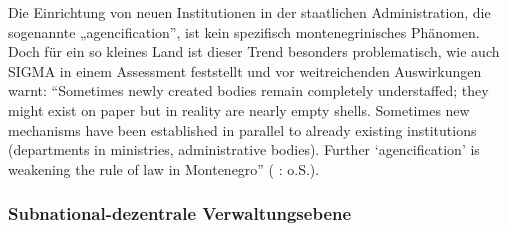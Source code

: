 Die Einrichtung von neuen Institutionen in der staatlichen Administration, die sogenannte „agencification”, ist kein spezifisch montenegrinisches Phänomen. Doch für ein so kleines Land ist dieser Trend besonders problematisch, wie auch SIGMA in einem Assessment feststellt und vor weitreichenden Auswirkungen warnt: “Sometimes newly created bodies remain completely understaffed; they might exist on paper but in reality are nearly empty shells. Sometimes new mechanisms have been established in parallel to already existing institutions (departments in ministries, administrative bodies). Further ‘agencification’ is weakening the rule of law in Montenegro” ( \cite{oecd11a} : o.S.).

\subsubsection{Subnational-dezentrale Verwaltungsebene}

